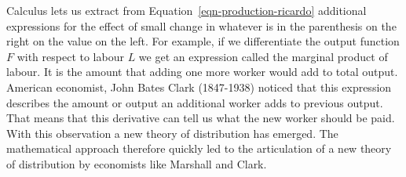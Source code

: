 Calculus lets us extract from Equation~\ref{eqn-production-ricardo} additional expressions for the effect of  small change in whatever is in the parenthesis on the right on the value on the left.  For example, if we differentiate the output function $F$ with respect to labour $L$ we get an expression called the \gls{marginal product} of labour. It is the amount that adding one more worker would add to total output. American economist, John Bates Clark (1847-1938) noticed that this expression describes the amount  or output an additional worker adds  to previous output. That means 
 that this derivative can tell us what the new worker should be paid. With this observation a new theory of distribution has emerged.  The mathematical approach therefore  quickly led to the articulation of a new theory of distribution by economists like Marshall and  Clark.%


